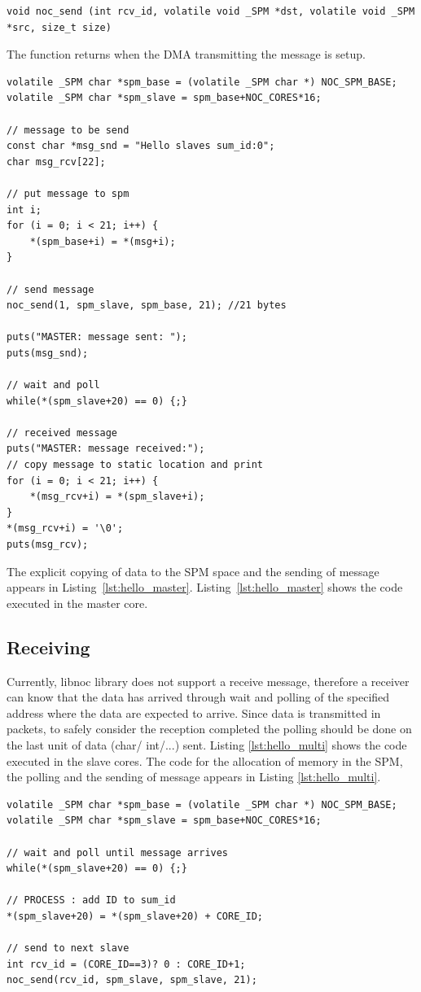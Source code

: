 \documentclass[a4paper,fontsize=10pt,twoside,DIV15,BCOR12mm,headinclude=true,footinclude=false,pagesize,bibtotoc]{scrbook}
\begin{document}
\begin{lstlisting}
void noc_send (int rcv_id, volatile void _SPM *dst, volatile void _SPM *src, size_t size)
\end{lstlisting}

The function returns when the DMA transmitting the message is setup.

\begin{lstlisting}[float,caption={A 2x2 Hello World application: Master.\label{lst:hello_master}}]
volatile _SPM char *spm_base = (volatile _SPM char *) NOC_SPM_BASE;
volatile _SPM char *spm_slave = spm_base+NOC_CORES*16;

// message to be send
const char *msg_snd = "Hello slaves sum_id:0";
char msg_rcv[22];

// put message to spm
int i;
for (i = 0; i < 21; i++) {
	*(spm_base+i) = *(msg+i);
}

// send message
noc_send(1, spm_slave, spm_base, 21); //21 bytes

puts("MASTER: message sent: ");
puts(msg_snd);

// wait and poll
while(*(spm_slave+20) == 0) {;}

// received message
puts("MASTER: message received:");
// copy message to static location and print
for (i = 0; i < 21; i++) {
	*(msg_rcv+i) = *(spm_slave+i);
}
*(msg_rcv+i) = '\0';
puts(msg_rcv);

\end{lstlisting}


The explicit copying of data to the SPM space and the sending of message appears 
in Listing~\ref{lst:hello_master}. Listing~\ref{lst:hello_master}
shows the code executed in the master core.

\subsection{Receiving}
Currently, libnoc library does not support a receive message,
therefore a receiver can know that the data has arrived through wait
and polling of the specified address where the data are expected to arrive.
Since data is transmitted in packets, to safely consider the reception completed
the polling should be done on the last unit of data (char/ int/...) sent.
Listing \ref{lst:hello_multi} shows the code executed in the slave cores.
The code for the allocation of memory in the SPM, the polling and the sending of message 
appears in Listing \ref{lst:hello_multi}.

\begin{lstlisting}[float,caption={A 2x2 Hello World application: Slave.\label{lst:hello_multi}}]
volatile _SPM char *spm_base = (volatile _SPM char *) NOC_SPM_BASE;
volatile _SPM char *spm_slave = spm_base+NOC_CORES*16;

// wait and poll until message arrives
while(*(spm_slave+20) == 0) {;}

// PROCESS : add ID to sum_id
*(spm_slave+20) = *(spm_slave+20) + CORE_ID;

// send to next slave
int rcv_id = (CORE_ID==3)? 0 : CORE_ID+1;
noc_send(rcv_id, spm_slave, spm_slave, 21);

\end{lstlisting}
\end{document}
